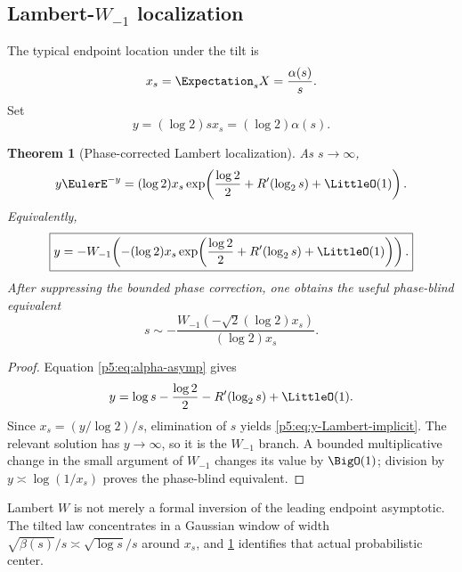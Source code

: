 \documentclass[11pt]{article}
\numberwithin{equation}{section}
\newtheorem{theorem}{Theorem}[section]
\theoremstyle{definition}
\theoremstyle{remark}
\begin{document}
\subsection{Lambert-$W_{-1}$ localization}

The typical endpoint location under the tilt is
\begin{equation}\label{p5:eq:xs}
 x_s=\Expectation_sX=\frac{\alpha(s)}s.
\end{equation}
Set
\begin{equation}\label{p5:eq:y-def}
 y=(\log2)sx_s=(\log2)\alpha(s).
\end{equation}

\begin{theorem}[Phase-corrected Lambert localization]\label{p5:thm:Lambert-localization}
As $s\to\infty$,
\begin{equation}\label{p5:eq:y-Lambert-implicit}
 y\EulerE^{-y}=(\log2)x_s
 \exp\!\left(\frac{\log2}{2}+R'(\log_2s)+\LittleO(1)\right).
\end{equation}
Equivalently,
\begin{equation}\label{p5:eq:y-W}
 \boxed{
 y=-W_{-1}\!\left(-(
 \log2)x_s\exp\!\left(\frac{\log2}{2}+R'(\log_2s)+\LittleO(1)\right)
 \right).}
\end{equation}
After suppressing the bounded phase correction, one obtains the useful
phase-blind equivalent
\begin{equation}\label{p5:eq:s-W-leading}
 s\sim
 -\frac{W_{-1}(-\sqrt2(\log2)x_s)}{(\log2)x_s}.
\end{equation}
\end{theorem}

\begin{proof}
Equation \cref{p5:eq:alpha-asymp} gives
\[
 y=\log s-\frac{\log2}{2}-R'(\log_2s)+\LittleO(1).
\]
Since $x_s=(y/\log2)/s$, elimination of $s$ yields
\cref{p5:eq:y-Lambert-implicit}.  The relevant solution has $y\to\infty$, so it
is the $W_{-1}$ branch.  A bounded multiplicative change in the small argument
of $W_{-1}$ changes its value by $\BigO(1)$; division by
$y\asymp\log(1/x_s)$ proves the phase-blind equivalent.
\end{proof}

\begin{remark}
Lambert $W$ is not merely a formal inversion of the leading endpoint
asymptotic.  The tilted law concentrates in a Gaussian window of width
$\sqrt{\beta(s)}/s\asymp\sqrt{\log s}/s$ around $x_s$, and
\cref{p5:thm:Lambert-localization} identifies that actual probabilistic center.
\end{remark}
\end{document}
